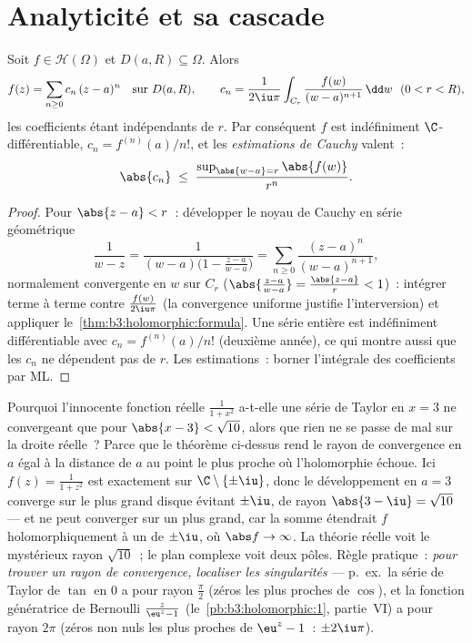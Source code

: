 \section{Analyticité et sa cascade}

\begin{theorem}[Holomorphe $=$ analytique]
\label{thm:b3:holomorphic:analytic}
Soit $f \in \mathcal H(\Omega)$ et $D(a, R) \subseteq \Omega$.
Alors
\[
f(z) = \sum_{n\geq0}c_n\,(z - a)^n \quad \text{sur } D(a, R),
\qquad
c_n = \frac1{2\iu\pi}\int_{C_r}\frac{f(w)}{(w -
a)^{n+1}}\,\dd w \ \ (0 < r < R),
\]
les coefficients étant indépendants de $r$. Par conséquent $f$
est indéfiniment $\C$-différentiable, $c_n = f^{(n)}(a)/n!$, et
les \emph{estimations de Cauchy}
valent~:
\[
\abs{c_n} \;\leq\; \frac{\sup_{\abs{w - a} =
r}\abs{f(w)}}{r^{n}} .
\]
\end{theorem}

\begin{proof}
Pour $\abs{z - a} < r$~: développer le noyau de Cauchy en série
géométrique
\[
\frac1{w - z} = \frac1{(w - a)\bigl(1 - \frac{z - a}{w -
a}\bigr)} = \sum_{n\geq0}\frac{(z - a)^n}{(w - a)^{n+1}},
\]
normalement convergente en $w$ sur $C_r$ ($\abs{\frac{z-a}{w-a}} =
\frac{\abs{z-a}}r < 1$)~: intégrer terme à terme contre
$\frac{f(w)}{2\iu\pi}$ (la convergence uniforme justifie
l'interversion) et appliquer le~\cref{thm:b3:holomorphic:formula}.
Une série entière est indéfiniment différentiable avec $c_n =
f^{(n)}(a)/n!$ (deuxième année), ce qui montre aussi que les
$c_n$ ne dépendent pas de $r$. Les estimations~: borner
l'intégrale des coefficients par ML.
\end{proof}

\begin{example}
\label{ex:b3:holomorphic:radius}
Pourquoi l'innocente fonction réelle $\frac1{1 + x^2}$ a-t-elle
une série de Taylor en $x = 3$ ne convergeant que pour $\abs{x
- 3} < \sqrt{10}$, alors que rien ne se passe de mal sur la
droite réelle~? Parce que le théorème ci-dessus rend le rayon
de convergence en $a$ égal à la distance de $a$ au point le
plus proche où l'holomorphie échoue. Ici $f(z) = \frac1{1 +
z^2}$ est  exactement sur $\C\setminus\{\pm\iu\}$,
donc le développement en $a = 3$ converge sur le plus grand
disque évitant $\pm\iu$, de rayon $\abs{3 - \iu} = \sqrt{10}$
--- et ne peut converger sur un plus grand, car la somme
étendrait $f$ holomorphiquement à un  de $\pm\iu$, où
$\abs f \to \infty$. La théorie réelle voit le mystérieux rayon
$\sqrt{10}$~; le plan complexe voit deux pôles. Règle pratique~:
\emph{pour trouver un rayon de convergence, localiser les
singularités} --- p.\ ex.\ la série de Taylor de $\tan$ en $0$
a pour rayon $\frac\pi2$ (zéros les plus proches de $\cos$), et
la fonction génératrice de Bernoulli $\frac z{\eu^z - 1}$
(le~\cref{pb:b3:holomorphic:1}, partie~VI) a pour rayon $2\pi$
(zéros non nuls les plus proches de $\eu^z - 1$~: $\pm2\iu\pi$).
\end{example}

